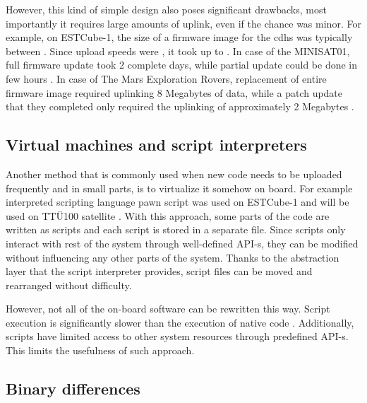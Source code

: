 However, this kind of simple design also poses significant drawbacks, most importantly it requires large amounts of uplink, even if the chance was minor. For example, on ESTCube-1, the size of a firmware image for the \gls{cdhs} was typically between . Since upload speeds were , it took up to . In case of the MINISAT01, full firmware update took 2 complete days, while partial update could be done in few hours \cite{Garrido1998}. In case of The Mars Exploration Rovers, replacement of entire firmware image required uplinking 8 Megabytes of data, while a patch update that they completed only required the uplinking of approximately 2 Megabytes \cite{Greco2005}. 

\subsection{Virtual machines and script interpreters}

Another method that is commonly used when new code needs to be uploaded frequently and in small parts, is to virtualize it somehow on board. For example interpreted scripting language pawn script was used on ESTCube-1 \cite{Suenter2016} and will be used on TTÜ100 satellite \cite{Aasavaeli2017}. With this approach, some parts of the code are written as scripts and each script is stored in a separate file. Since scripts only interact with rest of the system through well-defined API-s, they can be modified without influencing any other parts of the system. Thanks to the abstraction layer that the script interpreter provides, script files can be moved and rearranged without difficulty. 

However, not all of the on-board software can be rewritten this way. Script execution is significantly slower than the execution of native code . Additionally, scripts have limited access to other system resources through predefined API-s. This limits the usefulness of such approach.


\subsection{Binary differences}

